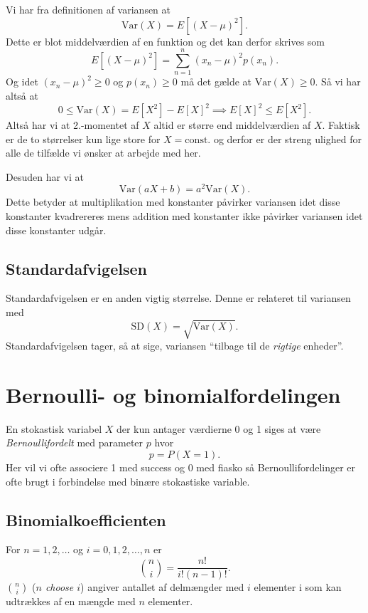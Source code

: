 Vi har fra definitionen af variansen at
\[ 
\mathrm{Var}(X) = E \left[ (X-\mu)^2 \right]
.\]
Dette er blot middelværdien af en funktion og det kan derfor skrives som
\[ 
  E \left[ (X-\mu)^2 \right] = \sum_{n = 1}^{n} (x_n - \mu)^2 p(x_n)
.\]
Og idet $(x_n - \mu)^2 \geq 0$ og $p(x_n) \geq 0$ må det gælde at $\mathrm{Var}(X) \geq 0$. Så vi har altså at
\[ 
  0 \leq \mathrm{Var}(X) = E \left[ X^2 \right] - E[X]^2 \implies E[X]^2 \leq E[X^2]
.\]
Altså har vi at 2.-momentet af $X$ altid er større end middelværdien af $X$. Faktisk er de to størrelser kun lige store for $X = \mathrm{const.}$ og derfor er der streng ulighed for alle de tilfælde vi ønsker at arbejde med her.

Desuden har vi at
\[ 
  \mathrm{Var}(aX + b) = a^2\mathrm{Var}(X)
.\]
Dette betyder at multiplikation med konstanter påvirker variansen idet disse konstanter kvadrereres mens addition med konstanter ikke påvirker variansen idet disse konstanter udgår.

\subsection{Standardafvigelsen}
Standardafvigelsen er en anden vigtig størrelse. Denne er relateret til variansen med
\[ 
  \mathrm{SD}(X) = \sqrt{\mathrm{Var}(X)}
.\]
Standardafvigelsen tager, så at sige, variansen ``tilbage til de \textit{rigtige} enheder''. 

\section{Bernoulli- og binomialfordelingen}
\begin{definition}[Bernoullifordelingen]
  En stokastisk variabel $X$ der kun antager værdierne 0 og 1 siges at være \textit{Bernoullifordelt} med parameter $p$ hvor
  \[ 
  p = P(X=1)
  .\]
  Her vil vi ofte associere 1 med success og 0 med fiasko så Bernoullifordelinger er ofte brugt i forbindelse med binære stokastiske variable.
\end{definition}

\subsection{Binomialkoefficienten}
For $n = 1,2,\ldots $ og $i = 0,1,2,\ldots, n$ er
\[ 
  \binom{n}{i} = \frac{n!}{i!(n-1)!}
.\]
$\binom{n}{i}$ (\textit{$n$ choose $i$}) angiver antallet af delmængder med $i$ elementer i som kan udtrækkes af en mængde med $n$ elementer.

